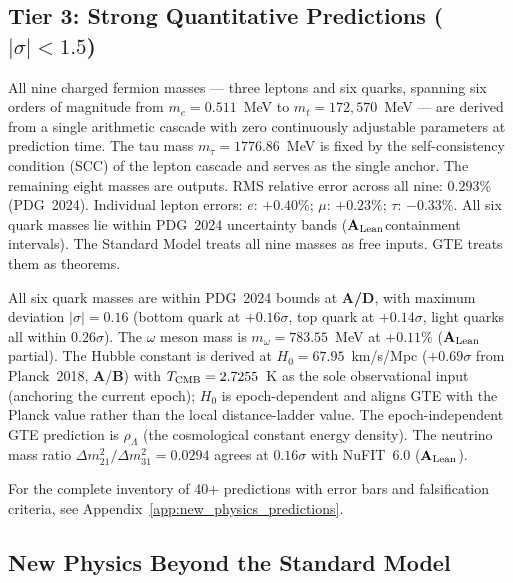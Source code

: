 \documentclass[11pt,openany]{book}
\theoremstyle{remark}
\newcommand{\CatA}{\textbf{A}}
\newcommand{\CatAL}{\ensuremath{\textbf{A}_{\rm Lean}}}
\newcommand{\CatAD}{\textbf{A/D}}
\newcommand{\CatB}{\textbf{B}}
\begin{document}
\FloatBarrier

\subsection*{Tier 3: Strong Quantitative Predictions ($|\sigma| < 1.5$)}

\begin{tcolorbox}[colback=orange!5,colframe=orange!60,title={Nine Charged Fermion Masses: 0.293\% RMS, Zero Free Parameters (\CatAD)}]
All nine charged fermion masses --- three leptons and six quarks, spanning six orders of
magnitude from $m_e = 0.511$~MeV to $m_t = 172{,}570$~MeV --- are derived from a single
arithmetic cascade with zero continuously adjustable parameters at prediction time.
The tau mass $m_\tau = 1776.86$~MeV is fixed by the self-consistency condition (SCC) of
the lepton cascade and serves as the single anchor.
The remaining eight masses are outputs.  RMS relative error across all nine: $\mathbf{0.293\%}$
(PDG~2024).  Individual lepton errors: $e$: $+0.40\%$; $\mu$: $+0.23\%$; $\tau$: $-0.33\%$.
All six quark masses lie within PDG~2024 uncertainty bands (\CatAL containment intervals).
The Standard Model treats all nine masses as free inputs.  GTE treats them as theorems.
\end{tcolorbox}

All six quark masses are within PDG~2024 bounds at \CatAD, with maximum deviation
$|{\sigma}| = 0.16$ (bottom quark at $+0.16\sigma$, top quark at $+0.14\sigma$,
light quarks all within $0.26\sigma$).
The $\omega$ meson mass is $m_\omega = 783.55$~MeV at $+0.11\%$ (\CatAL partial).
The Hubble constant is derived at $H_0 = 67.95$~km/s/Mpc ($+0.69\sigma$ from
Planck~2018, \CatA/\CatB) with $T_{\rm CMB} = 2.7255$~K as the sole observational
input (anchoring the current epoch); $H_0$ is epoch-dependent and aligns GTE with
the Planck value rather than the local distance-ladder value.
The epoch-independent GTE prediction is $\rho_\Lambda$ (the cosmological constant energy density).
The neutrino mass ratio $\Delta m^2_{21}/\Delta m^2_{31} = 0.0294$ agrees at
$0.16\sigma$ with NuFIT~6.0 (\CatAL).

For the complete inventory of 40+ predictions with error bars and falsification criteria,
see Appendix~\ref{app:new_physics_predictions}.

\subsection*{New Physics Beyond the Standard Model}
\end{document}
